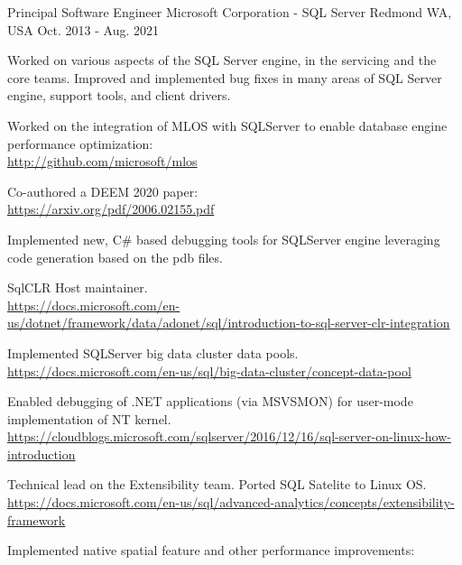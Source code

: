 \begin{cventries}
\cventry
{Principal Software Engineer} %
{Microsoft Corporation - SQL Server} %
{Redmond WA, USA} %
{Oct. 2013 - Aug. 2021} %
{
  \begin{cvitems} %
    \item 
    { 
      Worked on various aspects of the SQL Server engine, in the servicing and the core teams.
      Improved and implemented bug fixes in many areas of SQL Server engine, support tools, and client drivers.
    }
    \item
    {
      Worked on the integration of MLOS with SQLServer to enable database engine performance optimization:\\
      \scriptsize
      \url{http://github.com/microsoft/mlos}
    }
    \item
    {
      Co-authored a DEEM 2020 paper:\\
      \scriptsize
      \url{https://arxiv.org/pdf/2006.02155.pdf}
    }
    \item
    { 
      Implemented new, {C\#} based debugging tools for SQLServer engine leveraging code generation based on the pdb files.
    }
    \item
    {
      SqlCLR Host maintainer. \\
      \scriptsize
      \url{https://docs.microsoft.com/en-us/dotnet/framework/data/adonet/sql/introduction-to-sql-server-clr-integration}
    }
    \item
    {
      Implemented SQLServer big data cluster data pools. \\
      \scriptsize
      \url{https://docs.microsoft.com/en-us/sql/big-data-cluster/concept-data-pool}
    }
    \item
    {
      Enabled debugging of .NET applications (via MSVSMON) for user-mode implementation of NT kernel. \\
      \scriptsize
      \url{https://cloudblogs.microsoft.com/sqlserver/2016/12/16/sql-server-on-linux-how-introduction}
    }
    \item
    {
      Technical lead on the Extensibility team. Ported SQL Satelite to Linux OS. \\
      \scriptsize
      \url{https://docs.microsoft.com/en-us/sql/advanced-analytics/concepts/extensibility-framework}
    }
    \item
    {
      Implemented native spatial feature and other performance improvements: \\
}
\end{cvitems}}
\end{cventries}

